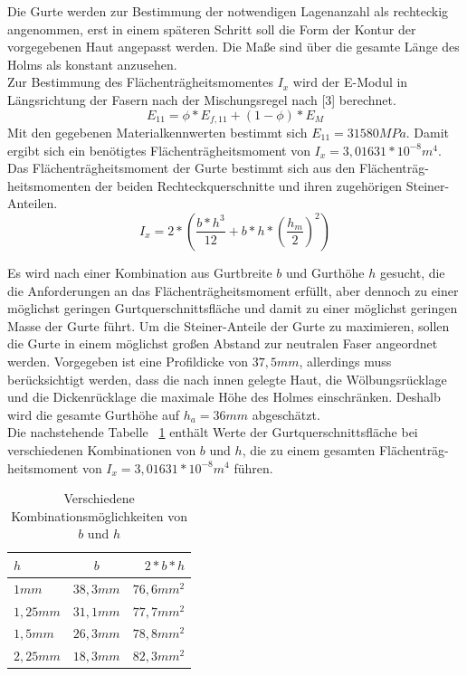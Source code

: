 \noindent Die Gurte werden zur Bestimmung der notwendigen Lagenanzahl als rechteckig angenommen, erst in einem späteren Schritt soll die Form der Kontur der vorgegebenen Haut angepasst werden. Die Maße sind über die gesamte Länge des Holms als konstant anzusehen.\\
Zur Bestimmung des Flächenträgheitsmomentes $ I_{x} $ wird der E-Modul in Längsrichtung der Fasern nach der Mischungsregel nach [3] berechnet.\\
\begin{equation}
 E_{11}=  \phi*E_{f,11}+\left( 1-\phi \right) * E_{M}
\end{equation}
Mit den gegebenen Materialkennwerten bestimmt sich $ E_{11} = 31580 MPa $. Damit ergibt sich ein benötigtes Flächenträgheitsmoment von $ I_{x} = 3,01631 * 10^{-8} m^{4} $.\\

\noindent Das Flächenträgheitsmoment der Gurte bestimmt sich aus den Flächenträg-heitsmomenten der beiden Rechteckquerschnitte und ihren zugehörigen Steiner-Anteilen.
\begin{equation}
	\label{Ix}
	I_{x}=2*\left(\frac{b*h^{3}}{12}+b*h*\left(\frac{h_{m}}{2}\right)^{2}\right)
\end{equation}

\noindent Es wird nach einer Kombination aus Gurtbreite $ b $ und Gurthöhe $ h $ gesucht, die die Anforderungen an das Flächenträgheitsmoment erfüllt, aber dennoch zu einer möglichst geringen Gurtquerschnittsfläche und damit zu einer möglichst geringen Masse der Gurte führt. Um die Steiner-Anteile der Gurte zu maximieren, sollen die Gurte in einem möglichst großen Abstand zur neutralen Faser angeordnet werden. Vorgegeben ist eine Profildicke von $ 37,5mm $, allerdings muss berücksichtigt werden, dass die nach innen gelegte Haut, die Wölbungsrücklage und die Dickenrücklage die maximale Höhe des Holmes einschränken. Deshalb wird die gesamte Gurthöhe auf $ h_{a}=36mm $ abgeschätzt.\\ 

\noindent Die nachstehende Tabelle ~\ref{bh} enthält Werte der Gurtquerschnittsfläche bei verschiedenen Kombinationen von $ b $ und $ h $, die zu einem gesamten Flächenträg-heitsmoment von $ I_{x} = 3,01631 * 10^{-8} m^{4} $ führen.\\
\begin{table}
	\caption{Verschiedene Kombinationsmöglichkeiten von $ b $ und $ h $}
	\label{bh}
	\begin{center}
		\begin{tabular}{l|c|r}
			$h$&$b$&$2*b*h$\\
			\hline
			$1mm$&$38,3mm$&$76,6mm^{2}$\\
			$1,25mm$&$31,1mm$&$77,7mm^{2}$\\
			$1,5mm$&$26,3mm$&$78,8mm^{2}$\\
			$2,25mm$&$18,3mm$&$82,3mm^{2}$\\
		\end{tabular}
	\end{center}
\end{table}

